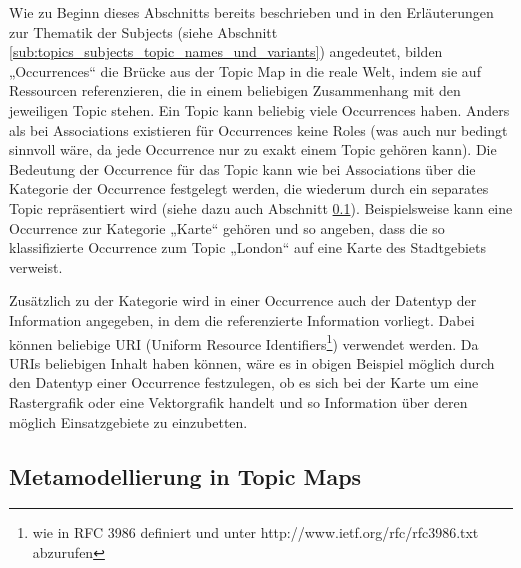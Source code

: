 Wie zu Beginn dieses Abschnitts bereits beschrieben und in den Erläuterungen zur Thematik der Subjects (siehe Abschnitt \ref{sub:topics_subjects_topic_names_und_variants}) angedeutet, bilden „Occurrences“ die Brücke aus der Topic Map in die reale Welt, indem sie auf Ressourcen referenzieren, die in einem beliebigen Zusammenhang mit den jeweiligen Topic stehen. Ein Topic kann beliebig viele Occurrences haben. Anders als bei Associations existieren für Occurrences keine Roles (was auch nur bedingt sinnvoll wäre, da jede Occurrence nur zu exakt einem Topic gehören kann). Die Bedeutung der Occurrence für das Topic kann wie bei Associations über die Kategorie der Occurrence festgelegt werden, die wiederum durch ein separates Topic repräsentiert wird (siehe dazu auch Abschnitt \ref{sub:metamodellierung_in_topic_maps}). Beispielsweise kann eine Occurrence zur Kategorie „Karte“ gehören und so angeben, dass die so klassifizierte Occurrence zum Topic „London“ auf eine Karte des Stadtgebiets verweist.

Zusätzlich zu der Kategorie wird in einer Occurrence auch der Datentyp der Information angegeben, in dem die referenzierte Information vorliegt. Dabei können beliebige URI (Uniform Resource Identifiers\footnote{wie in RFC 3986 definiert und unter http://www.ietf.org/rfc/rfc3986.txt abzurufen}) verwendet werden. Da URIs beliebigen Inhalt haben können, wäre es in obigen Beispiel möglich durch den Datentyp einer Occurrence festzulegen, ob es sich bei der Karte um eine Rastergrafik oder eine Vektorgrafik handelt und so Information über deren möglich Einsatzgebiete zu einzubetten.


\subsection{Metamodellierung in Topic Maps} %
\label{sub:metamodellierung_in_topic_maps}


